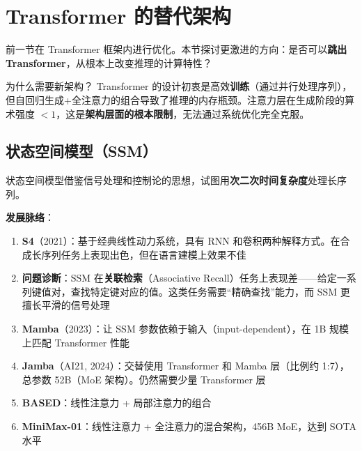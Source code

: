 \documentclass[a4paper]{article}
\begin{document}

\section{Transformer 的替代架构}

前一节在 Transformer 框架内进行优化。本节探讨更激进的方向：是否可以\textbf{跳出 Transformer}，从根本上改变推理的计算特性？

\begin{knowledgebox}{为什么需要新架构？}
Transformer 的设计初衷是高效\textbf{训练}（通过并行处理序列），但自回归生成+全注意力的组合导致了推理的内存瓶颈。注意力层在生成阶段的算术强度 $< 1$，这是\textbf{架构层面的根本限制}，无法通过系统优化完全克服。
\end{knowledgebox}

\subsection{状态空间模型（SSM）}

状态空间模型借鉴信号处理和控制论的思想，试图用\textbf{次二次时间复杂度}处理长序列。

\textbf{发展脉络}：

\begin{enumerate}
    \item \textbf{S4}（2021）：基于经典线性动力系统，具有 RNN 和卷积两种解释方式。在合成长序列任务上表现出色，但在语言建模上效果不佳

    \item \textbf{问题诊断}：SSM 在\textbf{关联检索}（Associative Recall）任务上表现差——给定一系列键值对，查找特定键对应的值。这类任务需要``精确查找''能力，而 SSM 更擅长平滑的信号处理

    \item \textbf{Mamba}（2023）：让 SSM 参数依赖于输入（input-dependent），在 1B 规模上匹配 Transformer 性能

    \item \textbf{Jamba}（AI21, 2024）：交替使用 Transformer 和 Mamba 层（比例约 1:7），总参数 52B（MoE 架构）。仍然需要少量 Transformer 层

    \item \textbf{BASED}：线性注意力 + 局部注意力的组合

    \item \textbf{MiniMax-01}：线性注意力 + 全注意力的混合架构，456B MoE，达到 SOTA 水平
\end{enumerate}
\end{document}
